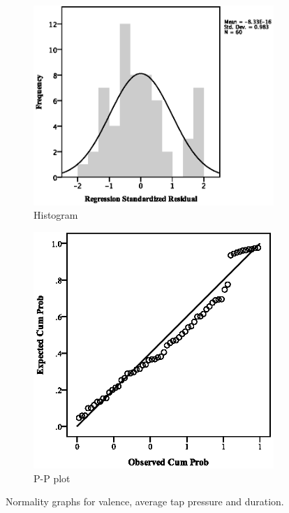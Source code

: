 \par\bigskip
\par\bigskip
\begin{figure}[ht]
\centering
\begin{subfigure}[b]{0.45\textwidth}
    \centering
    \includegraphics[width=\textwidth]{images/normality/valavg/HistValAvg.eps}
    \caption{Histogram}
    \label{fig:histvalavg}
\end{subfigure}
\quad
\begin{subfigure}[b]{0.45\textwidth}
    \centering
    \includegraphics[width=\textwidth]{images/normality/valavg/PPValAvg.eps}
    \caption{P-P plot}
    \label{fig:ppvalavg}
\end{subfigure}
\caption{Normality graphs for valence, average tap pressure and duration.}
\end{figure}
